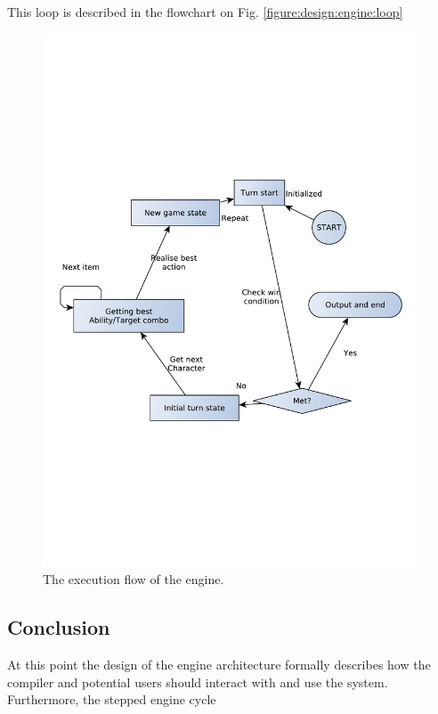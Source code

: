 This loop is described in the flowchart on Fig. \vref{figure:design:engine:loop}

\begin{figure}[h]
\centering
\includegraphics[scale=0.5, clip=true, trim=1cm 8cm 1cm 8cm]{img/engine_exec_loop}
\caption{\label{figure:design:engine:loop}The execution flow of the engine.}
\end{figure}

\subsection{Conclusion}
At this point the design of the engine architecture formally describes how the compiler and potential users should interact with and use the system. Furthermore, the stepped engine cycle